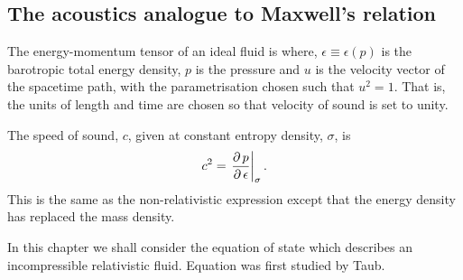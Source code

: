 \subsection{The acoustics analogue to Maxwell's relation}\label{sec:MaxwellAnalogue}

The energy-momentum tensor of an ideal fluid is\cite{LandauBook, Taub1978}
where, $\epsilon \equiv \epsilon(p)$ is the barotropic total energy density,
$p$ is the pressure
and 
$u$ is the velocity vector of the spacetime path, with the parametrisation chosen such that $u^2 =  1$. %
That is, the units of length and time are chosen so that velocity of sound is set to unity.

The speed of sound, $c$,  given at constant entropy density, $\sigma$, is\cite{LandauBook,Taub1978} 
\begin{align}
  c^2 = \left.{\frac{\operatorname{\partial} p}{\operatorname{\partial} \epsilon}}\right|_{\sigma}. \label{eqn:soundspeed}
\end{align}
This is the same as the non-relativistic expression except that the energy density has replaced the mass density.

In this chapter we shall consider the equation of state
which describes an incompressible relativistic fluid.
Equation  was first studied by Taub\cite{Taub1978}.

